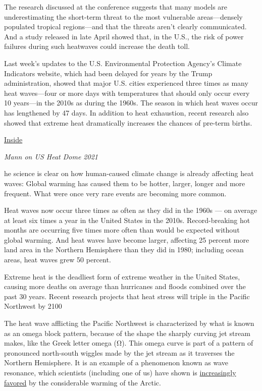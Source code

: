 \documentclass[
]{book}
\begin{document}
The research discussed at the conference suggests that many models are underestimating the short-term threat to the most vulnerable areas---densely populated tropical regions---and that the threats aren't clearly communicated. And a study released in late April showed that, in the U.S., the risk of power failures during such heatwaves could increase the death toll.

Last week's updates to the U.S. Environmental Protection Agency's Climate Indicators website, which had been delayed for years by the Trump administration, showed that major U.S. cities experienced three times as many heat waves---four or more days with temperatures that should only occur every 10 years---in the 2010s as during the 1960s. The season in which heat waves occur has lengthened by 47 days. In addition to heat exhaustion, recent research also showed that extreme heat dramatically increases the chances of pre-term births.

\href{https://insideclimatenews.org/news/16052021/extreme-heat-risks-climate-change/}{Inside}

\emph{Mann on US Heat Dome 2021}

he science is clear on how human-caused climate change is already affecting heat waves: Global warming has caused them to be hotter, larger, longer and more frequent. What were once very rare events are becoming more common.

Heat waves now occur three times as often as they did in the 1960s --- on average at least six times a year in the United States in the 2010s. Record-breaking hot months are occurring five times more often than would be expected without global warming. And heat waves have become larger, affecting 25 percent more land area in the Northern Hemisphere than they did in 1980; including ocean areas, heat waves grew 50 percent.

Extreme heat is the deadliest form of extreme weather in the United States, causing more deaths on average than hurricanes and floods combined over the past 30 years. Recent research projects that heat stress will triple in the Pacific Northwest by 2100

The heat wave afflicting the Pacific Northwest is characterized by what is known as an omega block pattern, because of the shape the sharply curving jet stream makes, like the Greek letter omega (Ω). This omega curve is part of a pattern of pronounced north-south wiggles made by the jet stream as it traverses the Northern Hemisphere. It is an example of a phenomenon known as wave resonance, which scientists (including one of us) have shown is \href{https://news.psu.edu/story/545128/2018/10/31/research/controlling-future-summer-weather-extremes-still-within-our-grasp}{increasingly favored} by the considerable warming of the Arctic.
\end{document}
